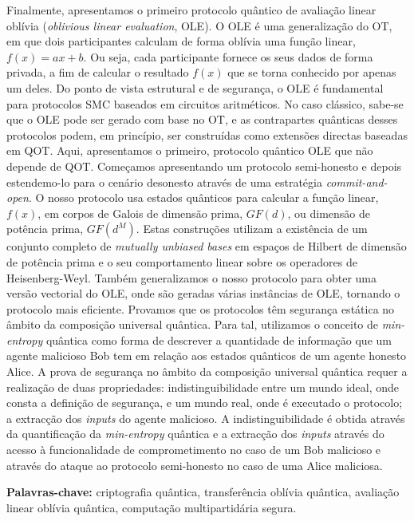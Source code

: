 \documentclass[11pt]{report}
\begin{document}
Finalmente, apresentamos o primeiro protocolo quântico de  avaliação linear oblívia (\textit{oblivious linear evaluation}, OLE). O OLE é uma generalização do OT, em que dois participantes calculam de forma oblívia uma função linear, $f(x) = ax + b$. Ou seja, cada participante fornece os seus dados de forma privada, a fim de calcular o resultado $f(x)$ que se torna conhecido por apenas um deles. Do ponto de vista estrutural e de segurança, o OLE é fundamental para protocolos SMC baseados em circuitos aritméticos. No caso clássico, sabe-se que o OLE pode ser gerado com base no OT, e as contrapartes quânticas desses protocolos podem, em princípio, ser construídas como extensões directas baseadas em QOT. Aqui, apresentamos o primeiro, protocolo quântico OLE que não depende de QOT. Começamos apresentando um protocolo semi-honesto e depois estendemo-lo para o cenário desonesto através de uma estratégia \textit{commit-and-open}. O nosso protocolo usa estados quânticos para calcular a função linear, $f(x)$, em corpos de Galois de dimensão prima, $GF(d)$, ou dimensão de potência prima, $GF(d^M)$. Estas construções utilizam a existência de um conjunto completo de \textit{mutually unbiased bases} em espaços de Hilbert de dimensão de potência prima e o seu comportamento linear sobre os operadores de Heisenberg-Weyl. Também generalizamos o nosso protocolo para obter uma versão vectorial do OLE, onde são geradas várias instâncias de OLE, tornando o protocolo mais eficiente. Provamos que os protocolos têm segurança estática no âmbito da composição universal quântica. Para tal, utilizamos o conceito de \textit{min-entropy} quântica como forma de descrever a quantidade de informação que um agente malicioso Bob tem em relação aos estados quânticos de um agente honesto Alice. A prova de segurança no âmbito da composição universal quântica requer a realização de duas propriedades: indistinguibilidade entre um mundo ideal, onde consta a definição de segurança, e um mundo real, onde é executado o protocolo; a extracção dos \textit{inputs} do agente malicioso. A indistinguibilidade é obtida através da quantificação da \textit{min-entropy} quântica e a extracção dos \textit{inputs} através do acesso à funcionalidade de comprometimento no caso de um Bob malicioso e através do ataque ao protocolo semi-honesto no caso de uma Alice maliciosa.


\vfill
\begin{flushleft}
\textbf{Palavras-chave:} criptografia qu\^{a}ntica, transferência oblívia quântica, avaliação linear oblívia quântica, computação multipartidária segura.
\end{flushleft}
\end{document}
